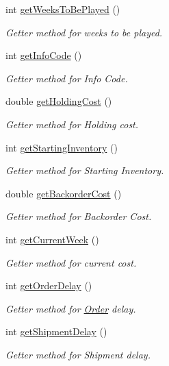 \begin{DoxyCompactItemize}
int \hyperlink{class_game_ad9d402aa7fdf97b4cbfa9e8e04301da0}{get\+Weeks\+To\+Be\+Played} ()
\begin{DoxyCompactList}\small\item\em Getter method for weeks to be played. \end{DoxyCompactList}\item 
int \hyperlink{class_game_a16cbdc46bd7268319249affa2f24ef3a}{get\+Info\+Code} ()
\begin{DoxyCompactList}\small\item\em Getter method for Info Code. \end{DoxyCompactList}\item 
double \hyperlink{class_game_a7bba0862ffb4fc160a491c982f70a113}{get\+Holding\+Cost} ()
\begin{DoxyCompactList}\small\item\em Getter method for Holding cost. \end{DoxyCompactList}\item 
int \hyperlink{class_game_aab81a9ebaccae9567297d73a44204e0d}{get\+Starting\+Inventory} ()
\begin{DoxyCompactList}\small\item\em Getter method for Starting Inventory. \end{DoxyCompactList}\item 
double \hyperlink{class_game_ab29ec1e3f5dd71e0f67b3bda884ff166}{get\+Backorder\+Cost} ()
\begin{DoxyCompactList}\small\item\em Getter method for Backorder Cost. \end{DoxyCompactList}\item 
int \hyperlink{class_game_aa131c51d4b09434ec8986048483ef17e}{get\+Current\+Week} ()
\begin{DoxyCompactList}\small\item\em Getter method for current cost. \end{DoxyCompactList}\item 
int \hyperlink{class_game_ab8a2d3843e55b53345bdb80b6b1e6503}{get\+Order\+Delay} ()
\begin{DoxyCompactList}\small\item\em Getter method for \hyperlink{class_order}{Order} delay. \end{DoxyCompactList}\item 
int \hyperlink{class_game_a9e3acf4f2ee399be2eb047ed036bc24f}{get\+Shipment\+Delay} ()
\begin{DoxyCompactList}\small\item\em Getter method for Shipment delay. \end{DoxyCompactList}\end{DoxyCompactItemize}
